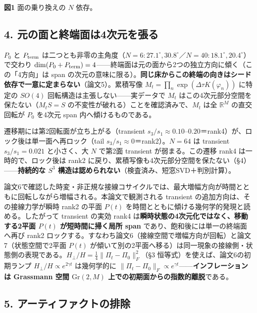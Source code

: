 \documentclass[
  a4paper,
]{ltjsarticle}
\begin{document}
\textbf{図1} 面の乗り換えの \(N\) 依存。

\subsection{4.
元の面と終端面は4次元を張る}\label{ux5143ux306eux9762ux3068ux7d42ux7aefux9762ux306f4ux6b21ux5143ux3092ux5f35ux308b}

\(P_0\) と \(P_{\rm term}\)
は二つとも非零の主角度（\(N=6{:}27.1^\circ,30.8^\circ\)／\(N=40{:}18.1^\circ,20.4^\circ\)）で交わり
\(\dim(P_0+P_{\rm term})=4\)------終端面は元の面から2つの独立方向に傾く（この「4方向」は
span
の次元の意味に限る）。\textbf{同じ床からこの終端の向きはシード依存で一意に定まらない}（論文5）。累積写像
\(M_t=\prod_n\exp(\Delta\tau K(\varphi_n))\) に特定の \(SO(4)\)
回転構造は主張しない------実データで \(M_t\)
はこの4次元部分空間を保たない（\(M_tS=S\)
の不変性が破れる）ことを確認済みで、\(M_t\) は全 \(\mathbb R^M\)
の直交回転が \(P_0\) を4次元 span 内へ傾けるものである。

遷移期には第2回転面が立ち上がる（transient
\(s_3/s_1\approx0.10\)--\(0.20\)＝rank4）が、ロック後は単一面へ再ロック（tail
\(s_3/s_1\approx0\)＝rank2）。\(N=64\) は transient \(s_3/s_1=0.021\)
と小さく、大 \(N\) で第2面 transient が弱まる。この遷移 rank4
は一時的で、ロック後は rank2
に戻り、累積写像も4次元部分空間を保たない（§4）------\textbf{持続的な
\(S^3\) 構造は認められない}（検査済み、短窓SVD＋判別計算）。

論文6で確認した時変・非正規な接線コサイクルでは、最大増幅方向が時間とともに回転しながら増幅される。本論文で観測される
transient の追加方向は、その接線力学が瞬時 rank2 の平面 \(P(t)\)
を時間とともに傾ける幾何学的発現と読める。したがって transient の実効
rank4 は\textbf{瞬時状態の4次元化ではなく、移動する2平面 \(P(t)\)
が短時間に掃く局所 span} であり、飽和後には単一の終端面へ再び rank2
ロックする。すなわち論文6（接線空間で増幅方向が回転）と論文7（状態空間で2平面
\(P(t)\)
が傾いて別の2平面へ移る）は同一現象の接線側・状態側の表現である。\(H_\perp/H=\tfrac14\|\Pi_t-\Pi_0\|_F^2\)（§3
恒等式）を使えば、論文6の初期ランプ \(H_\perp/H\propto e^{2\gamma t}\)
は幾何学的に
\(\|\Pi_t-\Pi_0\|_F\propto e^{\gamma t}\)------\textbf{インフレーションは
Grassmann 空間 \(\mathrm{Gr}(2,M)\)
上での初期面からの指数的離脱}である。

\subsection{5.
アーティファクトの排除}\label{ux30a2ux30fcux30c6ux30a3ux30d5ux30a1ux30afux30c8ux306eux6392ux9664}
\end{document}
